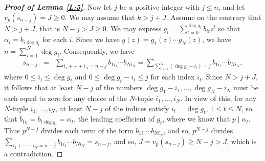 \documentclass[10pt,a4paper]{amsart}
\begin{document}
\begin{proof}[\bf Proof of Lemma \ref{L:5}]
Now let $j$ be a positive integer with $j\leq n$, and let $v_p(s_{n-j})=J\geq 0$. We may assume that $k > j+J$. Assume on the contrary that $N>j+J$, that is $N-j> J\geq 0$.  We may express $g_i=\sum_{t=0}^{\deg g_i}b_{it}z^t$ so that $\alpha_i=b_{i\deg g_i}$ for each $i$. Since we have $g(z)=g_1(z)\cdots g_N(z)$, we have $n=\sum_{i=1}^N \deg g_i$. Consequently, we have
\begin{eqnarray*}
s_{n-j}&=&\sum_{i_1+\cdots+i_N=n-j}b_{1i_1}\cdots b_{Ni_N}=\sum_{\sum_{t=1}^N(\deg g_t-i_t)=j} b_{1i_1}\cdots b_{Ni_N},
\end{eqnarray*}
where $0\leq i_t\leq \deg g_t$ and $0\leq \deg g_t -i_t\leq j$ for each index $i_t$. Since $N>j+J$, it follows that at least $N-j$ of the numbers $\deg g_1-i_1,\ldots,\deg g_N-i_N$ must be each equal to zero for any choice of the $N$-tuple $i_1,\ldots,i_N$. In view of this, for any $N$-tuple $i_1,\ldots, i_N$, at least $N-j$ of the indices satisfy $i_t=\deg g_t$, $1\leq t\leq N$, so that $b_{ti_t}=b_{t\deg g_t}=\alpha_t$, the leading coefficient of $g_t$, where we know that $p\mid \alpha_t$. Thus $p^{N-j}$ divides each term of the form $b_{1i_1}\cdots b_{Ni_N}$, and so, $p^{N-j}$ divides $\displaystyle \sum_{i_1+\cdots+i_N=n-j}b_{1i_1}\cdots b_{Ni_N}=s_{n-j}$, and so, $J=v_p(s_{n-j})\geq N-j>J$, which is a contradiction.
\end{proof}
\end{document}
